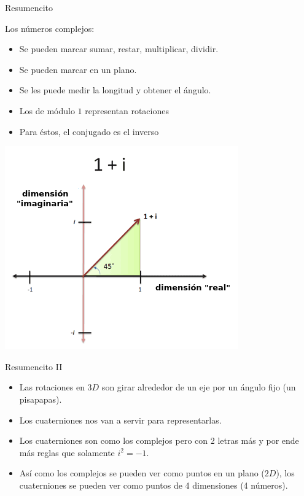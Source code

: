 \documentclass[10pt]{beamer}
\begin{document}
\begin{frame}{Resumencito}

Los números complejos:
\begin{itemize}
	\item Se pueden marcar sumar, restar, multiplicar, dividir.
	\item Se pueden marcar en un plano.
	\item Se les puede medir la longitud y obtener el ángulo.
	\item Los de módulo $1$ representan rotaciones
	\item Para éstos, el conjugado es el inverso
\end{itemize}

\includegraphics[scale=0.4]{images/1plusi.png}

\end{frame}

\begin{frame}{Resumencito II}
\begin{itemize}
	\item Las rotaciones en $3D$ son girar alrededor de un eje por un ángulo fijo (un pisapapas).
	\item Los cuaterniones nos van a servir para representarlas.
	\item Los cuaterniones son como los complejos pero con 2 letras más y por ende más reglas que solamente $i^2=-1$.%
	\item Así como los complejos se pueden ver como puntos en un plano ($2D$), los cuaterniones se pueden ver como puntos de 4 dimensiones (4 números).
\end{itemize}
\end{frame}
\end{document}

